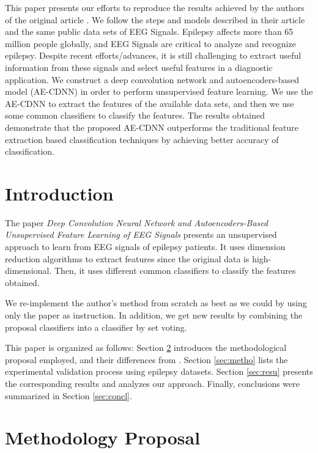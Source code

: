 
This paper presents our efforts to reproduce the results achieved by the authors of the original article \cite{WenZha:2018}. We follow the steps and models described in their article and the same public data sets of EEG Signals. Epilepsy affects more than 65 million people globally, and EEG Signals are critical to analyze and recognize epilepsy. Despite recent efforts/advances, it is still challenging to extract useful information from these signals and select useful features in a diagnostic application. We construct a deep convolution network and autoencoders-based model (AE-CDNN) in order to perform unsupervised feature learning. We use the AE-CDNN to extract the features of the available data sets, and then we use some common classifiers to classify the features. The results obtained demonstrate that the proposed AE-CDNN outperforms the traditional feature extraction based classification techniques by achieving better accuracy of classification.

\section{Introduction}

The paper {\it Deep Convolution Neural Network and Autoencoders-Based Unsupervised Feature Learning of EEG Signals} \cite{WenZha:2018} presents an unsupervised approach to learn from EEG signals of epilepsy patients. It uses dimension reduction algorithms to extract features since the original data is high-dimensional. Then, it uses different common classifiers to classify the features obtained. 	

We re-implement the author's method from scratch as best as we could by using only the paper as instruction. In addition, we get new results by combining the proposal classifiers into a classifier by set voting.

This paper is organized as follows: Section \ref{sec:propose} introduces the methodological proposal employed, and their differences from \cite{WenZha:2018}. Section \ref{sec:metho} lists the experimental validation process using epilepsy datasets. Section \ref{sec:resu} presents the corresponding results and analyzes our approach. Finally, conclusions were summarized in Section \ref{sec:concl}.



\section{Methodology Proposal}
\label{sec:propose}

